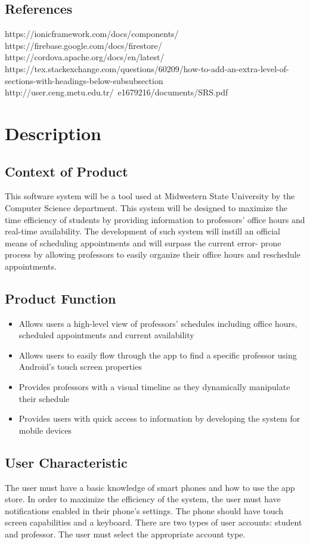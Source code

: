 \documentclass{article}
\begin{document}
  \subsection{References}
  https://ionicframework.com/docs/components/\newline
  https://firebase.google.com/docs/firestore/\newline
  https://cordova.apache.org/docs/en/latest/\newline
  https://tex.stackexchange.com/questions/60209/how-to-add-an-extra-level-of-sections-with-headings-below-subsubsection\newline
  http://user.ceng.metu.edu.tr/~e1679216/documents/SRS.pdf

  \section{Description}
  \subsection{Context of Product} 
  This software system will be a tool used at Midwestern State University by the Computer Science 
  department. This system will be designed to maximize the time efficiency of students by providing 
  information to professors' office hours and real-time availability. The development of such 
  system will instill an official means of scheduling appointments and will surpass the current error-
  prone process by allowing professors to easily organize their office hours and reschedule appointments.
  \subsection{Product Function}  
  \begin{itemize}
    \item Allows users a high-level view of professors' schedules including office hours, scheduled appointments
          and current availability
    \item Allows users to easily flow through the app to find a specific professor using Android's touch screen properties
    \item Provides professors with a visual timeline as they dynamically manipulate their schedule 
    \item Provides users with quick access to information by developing the system for mobile devices
  \end{itemize}
  \subsection{User Characteristic}
  The user must have a basic knowledge of smart phones and how to use the app store. In order to maximize 
  the efficiency of the system, the user must have notifications enabled in their phone's settings. The 
  phone should have touch screen capabilities and a keyboard. There are two types of user accounts: student
  and professor. The user must select the appropriate account type.
\end{document}
